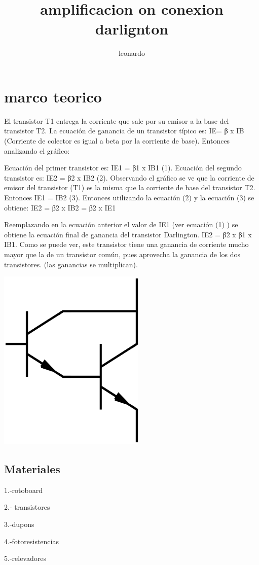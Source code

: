 \documentclass[12pt,a4paper]{article}
\author{leonardo}
\title{amplificacion on conexion darlignton}
\begin{document}
\section{marco teorico }
\begin{flushleft}
 El transistor T1 entrega la corriente que sale por su emisor a la base del transistor T2. La ecuación de ganancia de un transistor típico es: IE= β x IB (Corriente de colector es igual a beta por la corriente de base). Entonces analizando el gráfico:

Ecuación del primer transistor es: IE1 = β1 x IB1 (1).
Ecuación del segundo transistor es: IE2 = β2 x IB2 (2).
Observando el gráfico se ve que la corriente de emisor del transistor (T1) es la misma que la corriente de base del transistor T2. Entonces IE1 = IB2 (3). Entonces utilizando la ecuación (2) y la ecuación (3) se obtiene: IE2 = β2 x IB2 = β2 x IE1

Reemplazando en la ecuación anterior el valor de IE1 (ver ecuación (1) ) se obtiene la ecuación final de ganancia del transistor Darlington. IE2 = β2 x β1 x IB1. Como se puede ver, este transistor tiene una ganancia de corriente mucho mayor que la de un transistor común, pues aprovecha la ganancia de los dos transistores. (las ganancias se multiplican).
\end{flushleft}
\begin{flushleft}
\includegraphics[width=7cm]{1.png} 
\end{flushleft}
\begin{flushleft}
\section{Materiales}
\end{flushleft}
\begin{flushleft}
1.-rotoboard 
\end{flushleft}
\begin{flushleft}
2.- transistores
\end{flushleft}
\begin{flushleft}
3.-dupons
\end{flushleft}
\begin{flushleft}
4.-fotoresistencias
\end{flushleft}
\begin{flushleft}
5.-relevadores
\end{flushleft}
\end{document}
